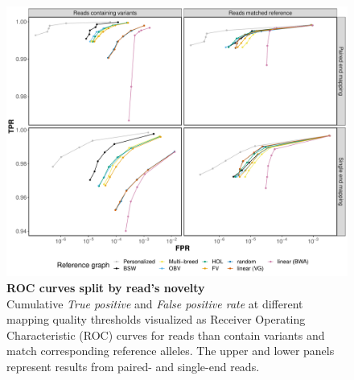\documentclass[../main.tex]{subfiles}
\begin{document}
\begin{flushleft}
\begin{figure}[!htb]
    \centering
    \includegraphics[width=\textwidth]{paper2/supplement/sp311.pdf}
    \caption[ ROC curves split by read’s novelty]{\textbf{ROC curves split by read’s novelty} \\
    \small{Cumulative \emph{True positive} and \emph{False positive rate} at different mapping quality
    thresholds visualized as Receiver Operating Characteristic (ROC) curves for reads
    than contain variants and match corresponding reference alleles. The upper and
    lower panels represent results from paired- and single-end reads.}}
    \label{sup_fig:s311}
\end{figure}


\end{flushleft}
\end{document}
